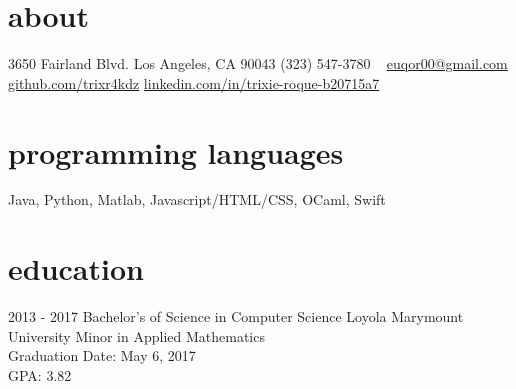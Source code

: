 \documentclass[]{friggeri-cv} %
\begin{document}


\begin{aside} %
  \section{about}
    3650 Fairland Blvd.
    Los Angeles, CA 90043
    (323) 547-3780
    ~
    \href{mailto:euqor00@gmail.com}{euqor00@gmail.com}
    \href{http://github.com/trixr4kdz}{github.com/trixr4kdz}
    \href{http://linkedin.com/in/trixie-roque-b20715a7}{linkedin.com/in/trixie-roque-b20715a7}
  \section{programming languages}
    Java, Python, Matlab, Javascript/HTML/CSS, OCaml, Swift
\end{aside}


\section{education}

  \begin{entrylist}


    \entry
      {2013 - 2017}
      {Bachelor's of Science {\normalfont in Computer Science}}
      {Loyola Marymount University}
      {Minor {\normalfont in Applied Mathematics} \\ 
      Graduation Date: May 6, 2017 \\
      GPA: 3.82}


\end{entrylist}
\end{document}
